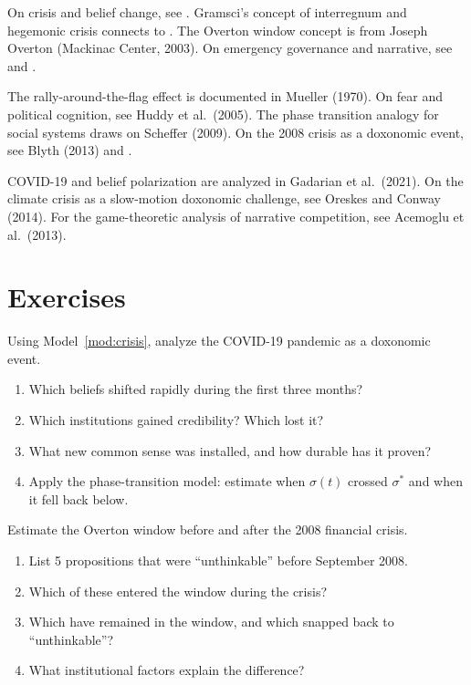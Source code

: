 On crisis and belief change, see \textcite{klein2007}.
Gramsci's concept of interregnum and hegemonic crisis connects to \textcite{gramsci1971}.
The Overton window concept is from Joseph Overton (Mackinac Center, 2003).
On emergency governance and narrative, see \textcite{lippmann1922} and \textcite{herman1988}.

The rally-around-the-flag effect is documented in Mueller (1970).
On fear and political cognition, see Huddy et al.\ (2005).
The phase transition analogy for social systems draws on Scheffer (2009).
On the 2008 crisis as a doxonomic event, see Blyth (2013) and \textcite{mirowski2009}.

COVID-19 and belief polarization are analyzed in Gadarian et al.\ (2021).
On the climate crisis as a slow-motion doxonomic challenge, see Oreskes and Conway (2014).
For the game-theoretic analysis of narrative competition, see Acemoglu et al.\ (2013).

\section{Exercises}

\begin{exercise}
Using Model~\ref{mod:crisis}, analyze the COVID-19 pandemic as a doxonomic event.
\begin{enumerate}[nosep]
  \item Which beliefs shifted rapidly during the first three months?
  \item Which institutions gained credibility? Which lost it?
  \item What new common sense was installed, and how durable has it proven?
  \item Apply the phase-transition model: estimate when $\sigma(t)$ crossed $\sigma^*$ and when it fell back below.
\end{enumerate}
\end{exercise}

\begin{exercise}
Estimate the Overton window before and after the 2008 financial crisis.
\begin{enumerate}[nosep]
  \item List 5 propositions that were ``unthinkable'' before September 2008.
  \item Which of these entered the window during the crisis?
  \item Which have remained in the window, and which snapped back to ``unthinkable''?
  \item What institutional factors explain the difference?
\end{enumerate}
\end{exercise}

